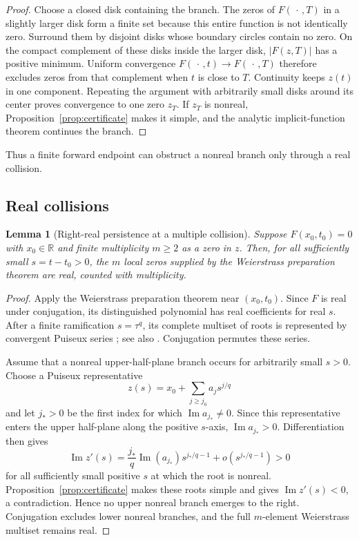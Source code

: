 \documentclass[11pt,a4paper]{amsart}
\newtheorem{lemma}[theorem]{Lemma}
\theoremstyle{definition}
\theoremstyle{remark}
\newcommand{\R}{\mathbb R}
\begin{document}
\begin{proof}
Choose a closed disk containing the branch.  The zeros of
$F(\,\cdot\,,T)$ in a slightly larger disk form a finite set because this
entire function is not identically zero.  Surround them by disjoint disks
whose boundary circles contain no zero.  On the compact complement of these
disks inside the larger disk, $|F(z,T)|$ has a positive minimum.  Uniform
convergence $F(\,\cdot\,,t)\to F(\,\cdot\,,T)$ therefore excludes zeros from
that complement when $t$ is close to $T$.  Continuity keeps $z(t)$ in one
component.  Repeating the argument with arbitrarily small disks around its
center proves convergence to one zero $z_T$.  If $z_T$ is
nonreal, Proposition~\ref{prop:certificate} makes it simple, and the analytic
implicit-function theorem continues the branch.
\end{proof}

Thus a finite forward endpoint can obstruct a nonreal branch only through a
real collision.

\subsection{Real collisions}

\begin{lemma}[Right-real persistence at a multiple collision]\label{lem:collision}
Suppose $F(x_0,t_0)=0$ with $x_0\in\R$ and finite multiplicity $m\geq2$ as a zero in $z$.  Then, for all sufficiently small $s=t-t_0>0$, the $m$ local zeros supplied by the Weierstrass preparation theorem are real, counted with multiplicity.
\end{lemma}

\begin{proof}
Apply the Weierstrass preparation theorem near $(x_0,t_0)$.  Since $F$ is real under conjugation, its distinguished polynomial has real coefficients for real $s$.  After a finite ramification $s=\tau^q$, its complete multiset of roots is represented by convergent Puiseux series \cite[Ch.~2]{Wall2004}; see also \cite{Chirka1989}.  Conjugation permutes these series.

Assume that a nonreal upper-half-plane branch occurs for arbitrarily small $s>0$.  Choose a Puiseux representative
\[
  z(s)=x_0+\sum_{j\geq j_0}a_j s^{j/q}
\]
and let $j_*>0$ be the first index for which
$\operatorname{Im}a_{j_*}\neq0$.  Since this representative enters the upper
half-plane along the positive $s$-axis,
$\operatorname{Im}a_{j_*}>0$.  Differentiation then gives
\[
  \operatorname{Im}z'(s)
  =\frac{j_*}{q}\operatorname{Im}(a_{j_*})s^{j_*/q-1}
   +o\!\left(s^{j_*/q-1}\right)>0
\]
for all sufficiently small positive $s$ at which the root is nonreal.
Proposition~\ref{prop:certificate} makes these roots simple and gives
$\operatorname{Im}z'(s)<0$, a contradiction.  Hence no upper nonreal branch
emerges to the right.  Conjugation excludes lower nonreal branches, and the
full $m$-element Weierstrass multiset remains real.
\end{proof}
\end{document}
